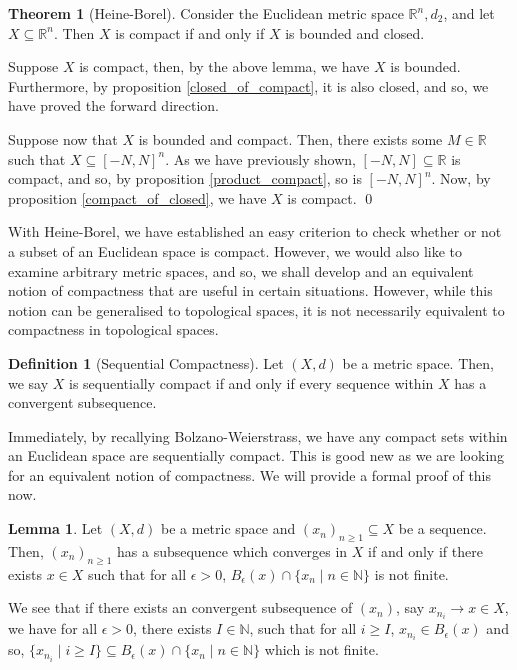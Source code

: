 \documentclass[
]{article}
\theoremstyle{definition}
\newtheorem{theorem}{Theorem}
\theoremstyle{definition}
\newtheorem{definition}{Definition}[section]
\newtheorem{lemma}{Lemma}[section]
\begin{document}
\begin{theorem}[Heine-Borel]
  Consider the Euclidean metric space \(\mathbb{R}^n, d_2\), and let 
  \(X \subseteq \mathbb{R}^n\). Then \(X\) is compact if and only if \(X\) is 
  bounded and closed.
\end{theorem}
\proof

Suppose \(X\) is compact, then, by the above lemma, we have \(X\) is
bounded. Furthermore, by proposition \ref{closed_of_compact}, it is also
closed, and so, we have proved the forward direction.

Suppose now that \(X\) is bounded and compact. Then, there exists some
\(M \in \mathbb{R}\) such that \(X \subseteq [-N, N]^n\). As we have
previously shown, \([-N, N] \subseteq \mathbb{R}\) is compact, and so,
by proposition \ref{product_compact}, so is \([-N, N]^n\). Now, by
proposition \ref{compact_of_closed}, we have \(X\) is compact. \qed

With Heine-Borel, we have established an easy criterion to check whether
or not a subset of an Euclidean space is compact. However, we would also
like to examine arbitrary metric spaces, and so, we shall develop and an
equivalent notion of compactness that are useful in certain situations.
However, while this notion can be generalised to topological spaces, it
is not necessarily equivalent to compactness in topological spaces.

\begin{definition}[Sequential Compactness]
  Let \((X, d)\) be a metric space. Then, we say \(X\) is sequentially compact 
  if and only if every sequence within \(X\) has a convergent subsequence.
\end{definition}

Immediately, by recallying Bolzano-Weierstrass, we have any compact sets
within an Euclidean space are sequentially compact. This is good new as
we are looking for an equivalent notion of compactness. We will provide
a formal proof of this now.

\begin{lemma}
  Let \((X, d)\) be a metric space and \((x_n)_{n \ge 1} \subseteq X\) be a 
  sequence. Then, \((x_n)_{n \ge 1}\) has a subsequence which converges in \(X\) 
  if and only if there exists \(x \in X\) such that for all \(\epsilon > 0\), 
  \(B_\epsilon(x) \cap \{x_n \mid n \in \mathbb{N}\}\) is not finite.
\end{lemma}
\proof

We see that if there exists an convergent subsequence of \((x_n)\), say
\(x_{n_i} \to x \in X\), we have for all \(\epsilon > 0\), there exists
\(I \in \mathbb{N}\), such that for all \(i \ge I\),
\(x_{n_i} \in B_\epsilon(x)\) and so,
\(\{x_{n_i} \mid i \ge I\} \subseteq B_\epsilon(x)  \cap \{x_n \mid n \in \mathbb{N}\}\)
which is not finite.
\end{document}
